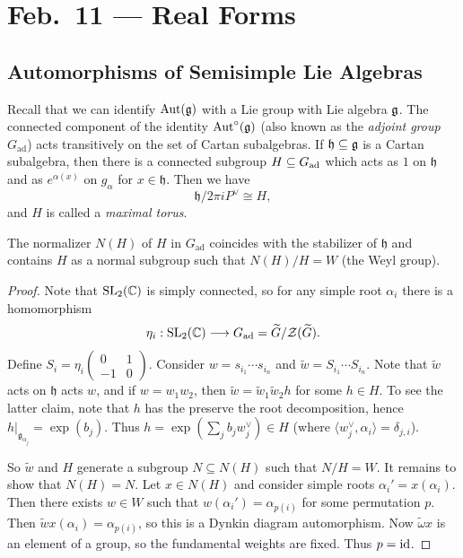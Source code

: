 \chapter{Feb.~11 --- Real Forms}

\section{Automorphisms of Semisimple Lie Algebras}

\begin{remark}
  Recall that we can identify
  $\operatorname{Aut}(\mathfrak{g})$ with a Lie group with
  Lie algebra $\mathfrak{g}$. The connected
  component of the identity
  $\operatorname{Aut}^\circ(\mathfrak{g})$ (also known as the
  \emph{adjoint group} $G_{\mathrm{ad}}$)
  acts transitively
  on the set of Cartan subalgebras.
  If $\mathfrak{h} \subseteq \mathfrak{g}$
  is a Cartan subalgebra, then there is
  a connected subgroup
  $H \subseteq G_{\operatorname{ad}}$ which
  acts as $1$ on $\mathfrak{h}$ and
  as $e^{\alpha(x)}$ on $g_\alpha$
  for $x \in \mathfrak{h}$. Then
  we have
  \[\mathfrak{h} / 2\pi i P^\vee \cong H,\]
  and $H$ is called a \emph{maximal torus}.
\end{remark}

\begin{prop}
  The normalizer $N(H)$ of $H$
  in $G_{\mathrm{ad}}$ coincides with the
  stabilizer of $\mathfrak{h}$ and
  contains $H$ as a normal subgroup
  such that $N(H) / H = W$ (the Weyl group).
\end{prop}

\begin{proof}
  Note that $\operatorname{SL}_2(\mathbb{C})$ is simply connected,
  so for any simple root $\alpha_i$
  there is a homomorphism
  \[
    \eta_i : \operatorname{SL}_2(\mathbb{C})
    \longrightarrow G_{\operatorname{ad}} = \widetilde{G} / \mathcal{Z}(\widetilde{G}).
  \]
  Define $S_i = \eta_i\left(\begin{smallmatrix}
    0 & 1 \\ -1 & 0
  \end{smallmatrix}\right)$.
  Consider $w = s_{i_1} \cdots s_{i_n}$
  and $\widetilde{w} = S_{i_1} \cdots S_{i_n}$.
  Note that $\widetilde{w}$ acts on
  $\mathfrak{h}$ acts $w$, and
  if $w = w_1 w_2$, then
  $\widetilde{w} = \widetilde{w}_1 \widetilde{w}_2 h$
  for some $h \in H$.
  To see the latter claim, note that $h$
  has the preserve the root decomposition,
  hence $h|_{\mathfrak{g}_{\alpha_j}} = \exp(b_j)$.
  Thus $h = \exp(\sum_j b_j w_j^\vee) \in H$
  (where $\langle w_j^\vee, \alpha_i \rangle = \delta_{j, i}$).

  So $\widetilde{w}$ and $H$ generate
  a subgroup $N \subseteq N(H)$ such that
  $N / H = W$. It remains to show that
  $N(H) = N$. Let $x \in N(H)$ and consider
  simple roots $\alpha_i' = x(\alpha_i)$.
  Then there exists $w \in W$ such that
  $w(\alpha_i') = \alpha_{p(i)}$ for some
  permutation $p$. Then
  $\widetilde{w} x(\alpha_i) = \alpha_{p(i)}$,
  so this is a Dynkin diagram automorphism.
  Now $\widetilde{\omega} x$ is an element
  of a group, so the fundamental
  weights are fixed. Thus
  $p = \operatorname{id}$.
\end{proof}

